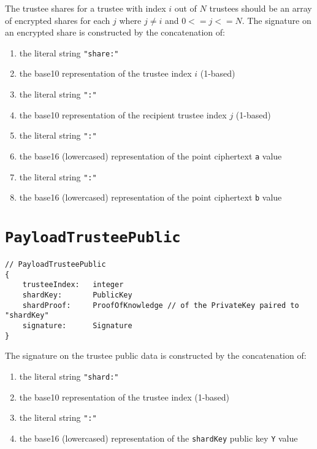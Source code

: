 The trustee shares for a trustee with index $i$ out of $N$ trustees should be an array of encrypted shares for each $j$ where $j \neq i$ and $0 <= j <= N$. The signature on an encrypted share is constructed by the concatenation of:

\begin{enumerate}
    \item the literal string \lstinline[style=ES6]{"share:"}
    \item the base10 representation of the trustee index $i$ (1-based)
    \item the literal string \lstinline[style=ES6]{":"}
    \item the base10 representation of the recipient trustee index $j$ (1-based)
    \item the literal string \lstinline[style=ES6]{":"}
    \item the base16 (lowercased) representation of the point ciphertext \texttt{a} value
    \item the literal string \lstinline[style=ES6]{":"}
    \item the base16 (lowercased) representation of the point ciphertext \texttt{b} value
\end{enumerate}

\section*{\texttt{PayloadTrusteePublic}}
\label{dt:payload:public}
\begin{lstlisting}[style=ES6]
// PayloadTrusteePublic
{
    trusteeIndex:   integer
    shardKey:       PublicKey
    shardProof:     ProofOfKnowledge // of the PrivateKey paired to "shardKey"
    signature:      Signature
}
\end{lstlisting}

The signature on the trustee public data is constructed by the concatenation of:

\begin{enumerate}
    \item the literal string \lstinline[style=ES6]{"shard:"}
    \item the base10 representation of the trustee index (1-based)
    \item the literal string \lstinline[style=ES6]{":"}
    \item the base16 (lowercased) representation of the \texttt{shardKey} public key \texttt{Y} value
\end{enumerate}

